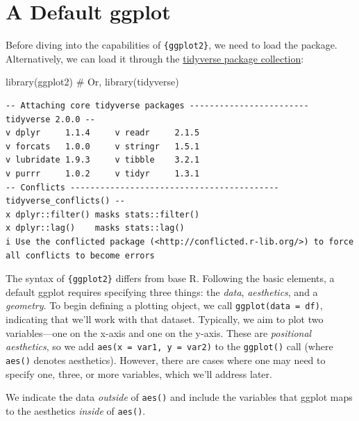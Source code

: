 \documentclass[
  letterpaper,
]{scrbook}
\newenvironment{Shaded}{\begin{snugshade}}{\end{snugshade}}
\newcommand{\CommentTok}[1]{\textcolor[rgb]{0.37,0.37,0.37}{#1}}
\newcommand{\FunctionTok}[1]{\textcolor[rgb]{0.28,0.35,0.67}{#1}}
\newcommand{\NormalTok}[1]{\textcolor[rgb]{0.00,0.23,0.31}{#1}}
\begin{document}
\section{A Default ggplot}\label{default}

Before diving into the capabilities of \texttt{\{ggplot2\}}, we need to
load the package. Alternatively, we can load it through the
\href{https://www.tidyverse.org/}{tidyverse package collection}:

\begin{Shaded}
\begin{Highlighting}[]
\FunctionTok{library}\NormalTok{(ggplot2)}
\CommentTok{\# Or,}
\FunctionTok{library}\NormalTok{(tidyverse)}
\end{Highlighting}
\end{Shaded}

\begin{verbatim}
-- Attaching core tidyverse packages ------------------------ tidyverse 2.0.0 --
v dplyr     1.1.4     v readr     2.1.5
v forcats   1.0.0     v stringr   1.5.1
v lubridate 1.9.3     v tibble    3.2.1
v purrr     1.0.2     v tidyr     1.3.1
-- Conflicts ------------------------------------------ tidyverse_conflicts() --
x dplyr::filter() masks stats::filter()
x dplyr::lag()    masks stats::lag()
i Use the conflicted package (<http://conflicted.r-lib.org/>) to force all conflicts to become errors
\end{verbatim}

The syntax of \texttt{\{ggplot2\}} differs from base R. Following the
basic elements, a default ggplot requires specifying three things: the
\emph{data}, \emph{aesthetics}, and a \emph{geometry}. To begin defining
a plotting object, we call \texttt{ggplot(data\ =\ df)}, indicating that
we'll work with that dataset. Typically, we aim to plot two
variables---one on the x-axis and one on the y-axis. These are
\emph{positional aesthetics}, so we add
\texttt{aes(x\ =\ var1,\ y\ =\ var2)} to the \texttt{ggplot()} call
(where \texttt{aes()} denotes aesthetics). However, there are cases
where one may need to specify one, three, or more variables, which we'll
address later.

\begin{tcolorbox}[enhanced jigsaw, rightrule=.15mm, arc=.35mm, title=\textcolor{quarto-callout-important-color}{\faExclamation}\hspace{0.5em}{Pay Attention!}, colback=white, toptitle=1mm, colbacktitle=quarto-callout-important-color!10!white, breakable, left=2mm, opacityback=0, leftrule=.75mm, bottomrule=.15mm, bottomtitle=1mm, colframe=quarto-callout-important-color-frame, coltitle=black, toprule=.15mm, opacitybacktitle=0.6, titlerule=0mm]

We indicate the data \emph{outside} of \texttt{aes()} and include the
variables that ggplot maps to the aesthetics \emph{inside} of
\texttt{aes()}.

\end{tcolorbox}
\end{document}
